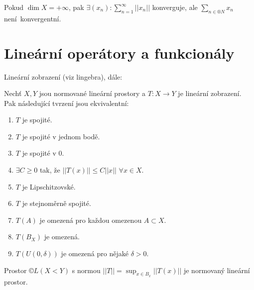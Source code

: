 \documentclass[12pt]{article}					%
\begin{document}
\begin{veta}
	Pokud $\dim X = +∞$, pak $\exists(x_n): \sum_{n=1}^∞ ||x_n||$ konverguje, ale $\sum_{n \in ®N}x_n$ není konvergentní.
\end{veta}

\section{Lineární operátory a funkcionály}
\begin{poznamka}
	Lineární zobrazení (viz lingebra), dále:
	
	\begin{veta}
		Nechť $X, Y$ jsou normované lineární prostory a $T: X \rightarrow Y$ je lineární zobrazení. Pak následující tvrzení jsou ekvivalentní:
		
		\begin{enumerate}
			\item $T$ je spojité.
			\item $T$ je spojité v jednom bodě.
			\item $T$ je spojité v 0.
			\item $\exists C ≥ 0$ tak, že $||T(x)|| ≤ C ||x||$ $\forall x \in X$.
			\item $T$ je Lipschitzovské.
			\item $T$ je stejnoměrně spojité.
			\item $T(A)$ je omezená pro každou omezenou $A \subset X$.
			\item $T(B_X)$ je omezená.
			\item $T(U(0, \delta))$ je omezená pro nějaké $\delta > 0$.
		\end{enumerate}
	\end{veta}

	Prostor $©L(X< Y)$ s normou $||T|| = \sup_{x \in B_x}||T(x)||$ je normovaný lineární prostor.
\end{poznamka}
\end{document}
